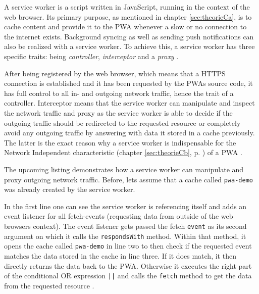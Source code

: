 A service worker is a script written in JavaScript, running in the context of the web browser. Its primary purpose, as mentioned in chapter \ref{sec:theorieCa}, is to cache content and provide it to the PWA whenever a slow or no connection to the internet exists. Background syncing as well as sending push notifications can also be realized with a service worker. To achieve this, a service worker has three specific traits: being \textit{controller}, \textit{interceptor} and a \textit{proxy} \cite[p. 176]{liebelProgressiveWebApps2019}.

After being registered by the web browser, which means that a HTTPS connection is established and it has been requested by the PWAs source code, it has full control to all in- and outgoing network traffic, hence the trait of a controller. Interceptor means that the service worker can manipulate and inspect the network traffic and proxy as the service worker is able to decide if the outgoing traffic should be redirected to the requested resource or completely avoid any outgoing traffic by answering with data it stored in a cache previously. The latter is the exact reason why a service worker is indispensable for the Network Independent characteristic (chapter \ref{sec:theorieCb}, p. \pageref{sec:theorieCb}) of a PWA \cite[p. 176-177]{liebelProgressiveWebApps2019}.

The upcoming listing demonstrates how a service worker can manipulate and proxy outgoing network traffic. Before, lets assume that a cache called \texttt{pwa-demo} was already created by the service worker.

\begin{center}
	\begin{minipage}{\textwidth}
		
	\end{minipage}
\end{center}

In the first line one can see the service worker is referencing itself and adds an event listener for all fetch-events (requesting data from outside of the web browsers context). The event listener gets passed the fetch \texttt{event} as its second argument on which it calls the \texttt{respondsWith} method. Within that method, it opens the cache called \texttt{pwa-demo} in line two to then check if the requested event matches the data stored in the cache in line three. If it does match, it then directly returns the data back to the PWA. Otherwise it executes the right part of the conditional OR expression \texttt{||} and calls the \texttt{fetch} method to get the data from the requested resource \cite[p. 60]{liebelProgressiveWebApps2019}.

